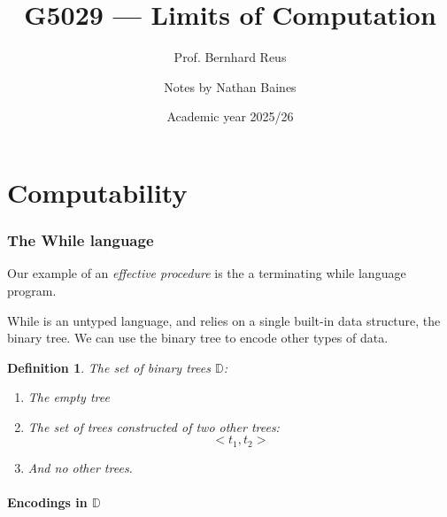 \documentclass[a4paper, final]{article}
\title{G5029 --- Limits of Computation}
\author{Prof. Bernhard Reus \and Notes by Nathan Baines}
\date{Academic year 2025/26}
\newtheorem{definition}{Definition}
\begin{document}
\maketitle

\tableofcontents

\part{Computability}
\section{The While language}
Our example of an \textit{effective procedure} is the a terminating while language program.

While is an untyped language, and relies on a single built-in data structure, the binary tree.
We can use the binary tree to encode other types of data.

\begin{definition}
	The set of binary trees $\mathbb{D}$:
	\begin{enumerate}
		\item The empty tree
		\item The set of trees constructed of two other trees:
		      $$<t_1,t_2>$$
		\item And no other trees.
	\end{enumerate}
\end{definition}

\subsection{Encodings in $\mathbb{D}$}
\end{document}
